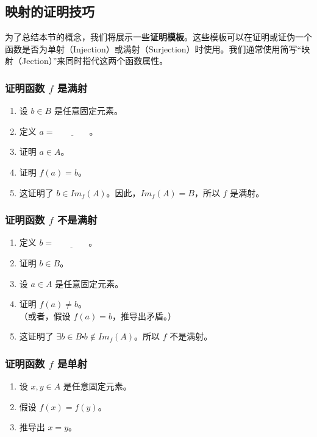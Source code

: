 
\subsection{映射的证明技巧}

为了总结本节的概念，我们将展示一些\textbf{证明模板}。这些模板可以在证明或证伪一个函数是否为单射（Injection）或满射（Surjection）时使用。我们通常使用简写``映射（Jection）''来同时指代这两个函数属性。

\subsubsection*{证明函数 $f$ 是满射}

\begin{enumerate}
    \item 设 $b \in B$ 是任意固定元素。
    \item 定义 $a = \underline{\qquad\qquad}$。
    \item 证明 $a \in A$。
    \item 证明 $f(a) = b$。
    \item 这证明了 $b \in Im_f(A)$。因此，$Im_f(A)=B$，所以 $f$ 是满射。
\end{enumerate}

\subsubsection*{证明函数 $f$ 不是满射}

\begin{enumerate}
    \item 定义 $b = \underline{\qquad\qquad}$。
    \item 证明 $b \in B$。
    \item 设 $a \in A$ 是任意固定元素。
    \item 证明 $f(a) \ne b$。\\
        （或者，假设 $f(a) = b$，推导出矛盾。）
    \item 这证明了 $\exists b \in B \centerdot b \notin Im_f(A)$。所以 $f$ 不是满射。
\end{enumerate}

\subsubsection*{证明函数 $f$ 是单射}

\begin{enumerate}
    \item 设 $x,y \in A$ 是任意固定元素。
    \item 假设 $f(x) = f(y)$。
    \item 推导出 $x = y$。\\
\end{enumerate}

